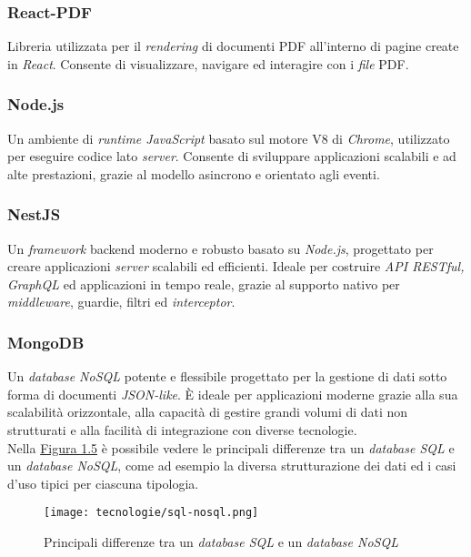 \subsubsection{React-PDF}

Libreria utilizzata per il \textit{rendering} di documenti PDF all’interno di pagine create in \textit{React}.
Consente di visualizzare, navigare ed interagire con i \textit{file} PDF.

\subsubsection{Node.js}

Un ambiente di \textit{runtime JavaScript} basato sul motore V8 di \textit{Chrome}, utilizzato per eseguire codice lato \textit{server}. 
Consente di sviluppare applicazioni scalabili e ad alte prestazioni, grazie al modello asincrono e orientato agli eventi.

\subsubsection{NestJS}

Un \textit{framework} \gls{backend} moderno e robusto basato su \textit{Node.js}, progettato per creare applicazioni \textit{server} scalabili ed efficienti.
Ideale per costruire \textit{API RESTful, GraphQL} ed applicazioni in tempo reale, grazie al supporto nativo per \textit{middleware}, guardie, filtri ed \textit{interceptor}.

\subsubsection{MongoDB}

Un \textit{database NoSQL} potente e flessibile progettato per la gestione di dati sotto forma di documenti \textit{JSON-like}. 
È ideale per applicazioni moderne grazie alla sua scalabilità orizzontale, alla capacità di gestire grandi volumi di dati non strutturati e alla facilità di integrazione con diverse tecnologie. \\
Nella {\hyperref[fig:sql-nosql]{Figura 1.5}} è possibile vedere le principali differenze tra un \textit{database SQL} e un \textit{database NoSQL}, come ad esempio la diversa strutturazione dei dati
ed i casi d'uso tipici per ciascuna tipologia.
\begin{figure}[H]
    \label{fig:sql-nosql}
    \centering
    \texttt{[image: tecnologie/sql-nosql.png]}
    \caption{Principali differenze tra un \textit{database SQL} e un \textit{database NoSQL}}
\end{figure}

